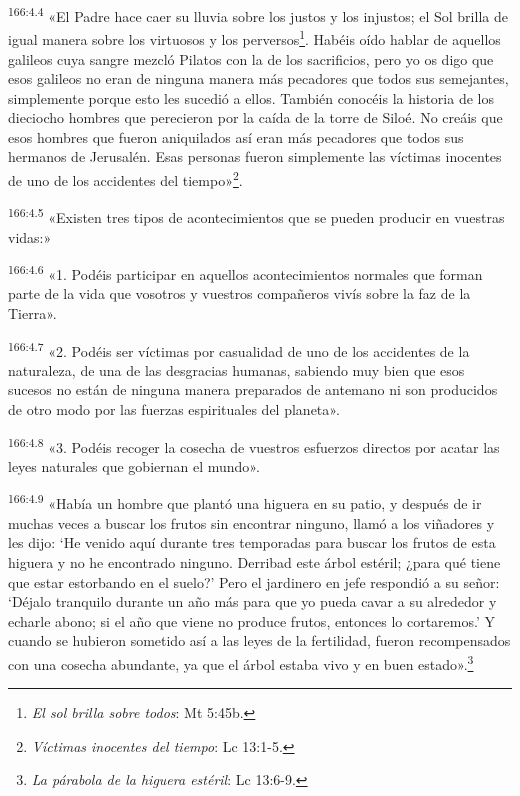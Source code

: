 \par 
\textsuperscript{166:4.4} «El Padre hace caer su lluvia sobre los justos y los injustos; el Sol brilla de igual manera sobre los virtuosos y los perversos\footnote{\textit{El sol brilla sobre todos}: Mt 5:45b.}. Habéis oído hablar de aquellos galileos cuya sangre mezcló Pilatos con la de los sacrificios, pero yo os digo que esos galileos no eran de ninguna manera más pecadores que todos sus semejantes, simplemente porque esto les sucedió a ellos. También conocéis la historia de los dieciocho hombres que perecieron por la caída de la torre de Siloé. No creáis que esos hombres que fueron aniquilados así eran más pecadores que todos sus hermanos de Jerusalén. Esas personas fueron simplemente las víctimas inocentes de uno de los accidentes del tiempo»\footnote{\textit{Víctimas inocentes del tiempo}: Lc 13:1-5.}.

\par 
\textsuperscript{166:4.5} «Existen tres tipos de acontecimientos que se pueden producir en vuestras vidas:»

\par 
\textsuperscript{166:4.6} «1. Podéis participar en aquellos acontecimientos normales que forman parte de la vida que vosotros y vuestros compañeros vivís sobre la faz de la Tierra».

\par 
\textsuperscript{166:4.7} «2. Podéis ser víctimas por casualidad de uno de los accidentes de la naturaleza, de una de las desgracias humanas, sabiendo muy bien que esos sucesos no están de ninguna manera preparados de antemano ni son producidos de otro modo por las fuerzas espirituales del planeta».

\par 
\textsuperscript{166:4.8} «3. Podéis recoger la cosecha de vuestros esfuerzos directos por acatar las leyes naturales que gobiernan el mundo».

\par 
\textsuperscript{166:4.9} «Había un hombre que plantó una higuera en su patio, y después de ir muchas veces a buscar los frutos sin encontrar ninguno, llamó a los viñadores y les dijo: `He venido aquí durante tres temporadas para buscar los frutos de esta higuera y no he encontrado ninguno. Derribad este árbol estéril; ¿para qué tiene que estar estorbando en el suelo?' Pero el jardinero en jefe respondió a su señor: `Déjalo tranquilo durante un año más para que yo pueda cavar a su alrededor y echarle abono; si el año que viene no produce frutos, entonces lo cortaremos.' Y cuando se hubieron sometido así a las leyes de la fertilidad, fueron recompensados con una cosecha abundante, ya que el árbol estaba vivo y en buen estado».\footnote{\textit{La párabola de la higuera estéril}: Lc 13:6-9.}

